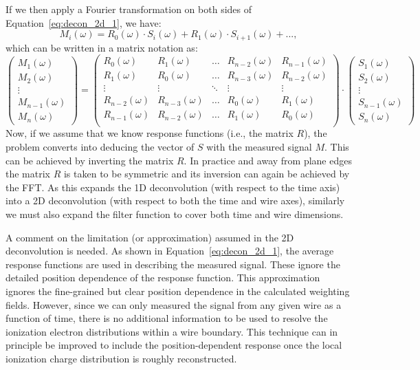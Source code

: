 If we then apply a Fourier transformation on both sides of Equation~\ref{eq:decon_2d_1},
we have:
\begin{equation}\label{eq:decon_2d_2}
M_i(\omega) = R_0(\omega) \cdot S_i(\omega) + R_1(\omega) \cdot S_{i+1} (\omega) + ...,
\end{equation} 
which can be written in a matrix notation as:
\begin{equation}
\begin{pmatrix}
    M_1(\omega)\\
    M_2(\omega)\\
    \vdots\\
    M_{n-1}(\omega)\\
    M_{n}(\omega)
\end{pmatrix}
=
\begin{pmatrix}
R_0(\omega) & R_1(\omega) & \ldots & R_{n-2}(\omega) & R_{n-1}(\omega) \\
R_1(\omega) & R_0(\omega) & \ldots & R_{n-3}(\omega) & R_{n-2}(\omega) \\
    \vdots  & \vdots      & \ddots & \vdots          & \vdots \\
    R_{n-2}(\omega) & R_{n-3}(\omega) & \ldots & R_0(\omega) & R_1(\omega) \\
    R_{n-1}(\omega) & R_{n-2}(\omega) & \ldots & R_1(\omega) & R_0(\omega) \\
\end{pmatrix}
\cdot
\begin{pmatrix}
    S_1(\omega)\\
    S_2(\omega)\\
    \vdots\\
    S_{n-1}(\omega)\\
    S_{n}(\omega)
\end{pmatrix}
\label{eq:matrix_expansion}
\end{equation}
Now, if we assume that we know response functions (i.e., the matrix $R$), the 
problem converts into deducing the vector of $S$ with the measured signal $M$. 
%
This can be achieved by inverting the matrix $R$. In practice and away
from plane edges the matrix $R$ is taken to be symmetric and its
inversion can again be achieved by the FFT.
%
As this expands the 1D deconvolution (with respect to the time axis)
into a 2D deconvolution (with respect to both the time and wire
axes), similarly we must also expand the filter function to cover
both time and wire dimensions.

A comment on the limitation (or approximation) 
assumed in the 2D deconvolution is needed. As shown in Equation~\ref{eq:decon_2d_1}, the 
average response functions are used in describing the measured signal. These 
ignore the detailed position dependence of the response function. 
This approximation ignores the fine-grained but clear position
dependence in the calculated weighting fields.
However, since we can only measured the signal from any given wire as
a function of time, there is no additional information to be used to
resolve the ionization electron distributions within a wire boundary.
This technique can in principle be improved to include the position-dependent
response once the local ionization charge distribution is roughly reconstructed. 

